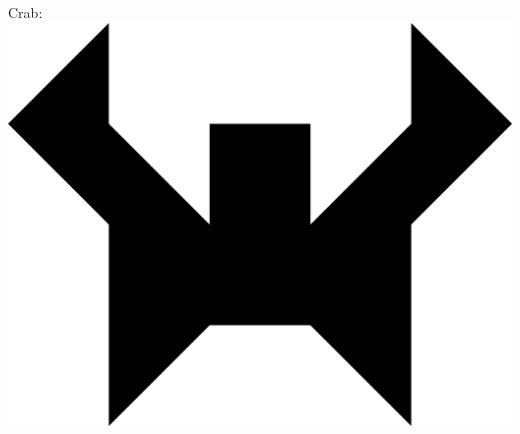 \documentclass{article}
\begin{document}
\begin{center}
\HUGE Crab:\\
  \includegraphics{crab.png}
\end{center}
\end{document}
